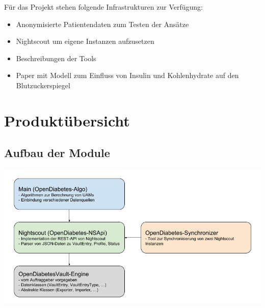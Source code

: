 \documentclass[accentcolor=tud0b,12pt,paper=a4]{tudreport}
\begin{document}
Für das Projekt stehen folgende Infrastrukturen zur Verfügung: 
\begin{itemize}
	\item Anonymisierte Patientendaten zum Testen der Ansätze
	\item Nightscout um eigene Instanzen aufzusetzen 
	\item Beschreibungen der Tools						%
	\item Paper mit Modell zum Einfluss von Insulin und Kohlenhydrate auf den Blutzuckerspiegel
\end{itemize}
	
	
\chapter{Produktübersicht}

\section*{Aufbau der Module}
\includegraphics[width=1\textwidth]{blockdiagramm.png}

\newpage
\end{document}
